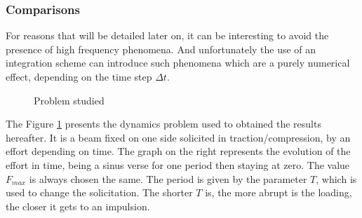 \documentclass[12pt,a4paper]{article}
\begin{document}
\subsubsection{Comparisons}

For reasons that will be detailed later on, it can be interesting to avoid the presence of high frequency phenomena. And unfortunately the use of an integration scheme can introduce such phenomena which are a purely numerical effect, depending on the time step $\Delta t$.

\begin{figure}[!ht]
\centering
{}
\hspace{0.5cm}
\caption{Problem studied\label{TypicalProblem}}
\end{figure}
The Figure \ref{TypicalProblem} presents the dynamics problem used to obtained the results hereafter. It is a beam fixed on one side solicited in traction/compression, by an effort depending on time. The graph on the right represents the evolution of the effort in time, being a sinus verse for one period then staying at zero. The value $F_{max}$ is always chosen the same. The period is given by the parameter $T$, which is used to change the solicitation. The shorter $T$ is, the more abrupt is the loading, the closer it gets to an impulsion.
\end{document}
